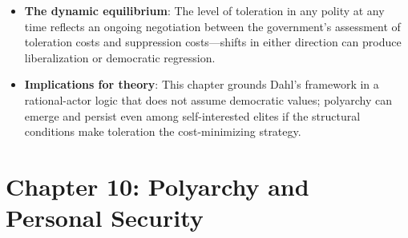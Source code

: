 \documentclass[12pt]{article}
\begin{document}
\begin{itemize}[leftmargin=*, itemsep=4pt]
    \item \textbf{The dynamic equilibrium}: The level of toleration in any polity at any time reflects an ongoing negotiation between the government's assessment of toleration costs and suppression costs---shifts in either direction can produce liberalization or democratic regression.
    \item \textbf{Implications for theory}: This chapter grounds Dahl's framework in a rational-actor logic that does not assume democratic values; polyarchy can emerge and persist even among self-interested elites if the structural conditions make toleration the cost-minimizing strategy.
\end{itemize}

\section{Chapter 10: Polyarchy and Personal Security}
\end{document}
